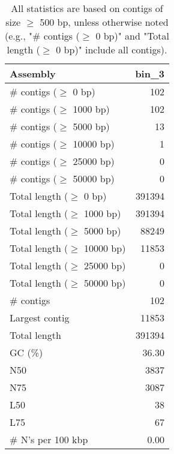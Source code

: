 \documentclass[12pt,a4paper]{article}
\begin{document}
\begin{table}[ht]
\begin{center}
\caption{All statistics are based on contigs of size $\geq$ 500 bp, unless otherwise noted (e.g., "\# contigs ($\geq$ 0 bp)" and "Total length ($\geq$ 0 bp)" include all contigs).}
\begin{tabular}{|l*{1}{|r}|}
\hline
Assembly & bin\_3 \\ \hline
\# contigs ($\geq$ 0 bp) & 102 \\ \hline
\# contigs ($\geq$ 1000 bp) & 102 \\ \hline
\# contigs ($\geq$ 5000 bp) & 13 \\ \hline
\# contigs ($\geq$ 10000 bp) & 1 \\ \hline
\# contigs ($\geq$ 25000 bp) & 0 \\ \hline
\# contigs ($\geq$ 50000 bp) & 0 \\ \hline
Total length ($\geq$ 0 bp) & 391394 \\ \hline
Total length ($\geq$ 1000 bp) & 391394 \\ \hline
Total length ($\geq$ 5000 bp) & 88249 \\ \hline
Total length ($\geq$ 10000 bp) & 11853 \\ \hline
Total length ($\geq$ 25000 bp) & 0 \\ \hline
Total length ($\geq$ 50000 bp) & 0 \\ \hline
\# contigs & 102 \\ \hline
Largest contig & 11853 \\ \hline
Total length & 391394 \\ \hline
GC (\%) & 36.30 \\ \hline
N50 & 3837 \\ \hline
N75 & 3087 \\ \hline
L50 & 38 \\ \hline
L75 & 67 \\ \hline
\# N's per 100 kbp & 0.00 \\ \hline
\end{tabular}
\end{center}
\end{table}
\end{document}

